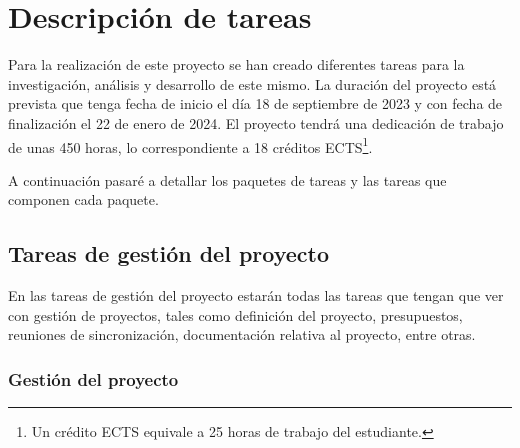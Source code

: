 \chapter{Descripción de tareas}
\label{cap:tareas}


Para la realización de este proyecto se han creado diferentes tareas para la investigación, análisis y desarrollo de este mismo. La duración del proyecto está prevista
que tenga fecha de inicio el día 18 de septiembre de 2023 y con fecha de finalización el 22 de enero de 2024. El proyecto tendrá una dedicación de trabajo de unas 450 horas,
lo correspondiente a 18 créditos ECTS\footnote{Un crédito ECTS equivale a 25 horas de trabajo del estudiante.\cite{ECTS}}.

A continuación pasaré a detallar los paquetes de tareas y las tareas que componen cada paquete.

\section{Tareas de gestión del proyecto}
\label{sec:tareas_gestion}


En las tareas de gestión del proyecto estarán todas las tareas que tengan que ver con gestión de proyectos, tales como definición del proyecto, presupuestos, reuniones de
sincronización, documentación relativa al proyecto, entre otras.

\subsection{Gestión del proyecto}
\label{subsec:tareas_gestion}


